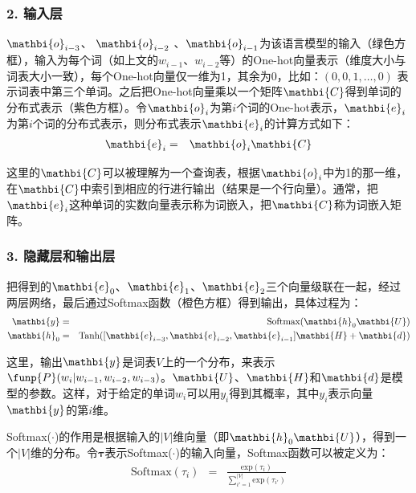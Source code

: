 \subsubsection{2. 输入层}

\parinterval  $ {\mathbi{o}}_{i-3} $、 $ {\mathbi{o}}_{i-2} $ 、$ {\mathbi{o}}_{i-1} $为该语言模型的输入（绿色方框），输入为每个词（如上文的$ w_{i-1}$、$ w_{i-2}$等）的One-hot向量表示（维度大小与词表大小一致），每个One-hot向量仅一维为1，其余为0，比如：$ (0,0,1,\dots,0) $ 表示词表中第三个单词。之后把One-hot向量乘以一个矩阵$ \mathbi{C} $得到单词的分布式表示（紫色方框）。令$ {\mathbi{o}}_i $为第$ i $个词的One-hot表示，$ {\mathbi{e}}_i $为第$ i $个词的分布式表示，则分布式表示$ {\mathbi{e}}_i $的计算方式如下：
\begin{eqnarray}
{\mathbi{e}}_i&=&{\mathbi{o}}_i{\mathbi{C}}
\label{eq:9-60}
\end{eqnarray}

\noindent  这里的$ \mathbi{C} $可以被理解为一个查询表，根据$ {\mathbi{o}}_i $中为1的那一维，在$ \mathbi{C}$中索引到相应的行进行输出（结果是一个行向量）。通常，把${\mathbi{e}}_i$这种单词的实数向量表示称为词嵌入，把$ \mathbi{C} $称为词嵌入矩阵。


\subsubsection{3. 隐藏层和输出层}

\parinterval  把得到的$ {\mathbi{e}}_0 $、$ {\mathbi{e}}_1 $、$ {\mathbi{e}}_2 $三个向量级联在一起，经过两层网络，最后通过Softmax函数（橙色方框）得到输出，具体过程为：
\begin{eqnarray}
{\mathbi{y}}&=&{\textrm{Softmax}}({\mathbi{h}}_0{\mathbi{U}})\label{eq:9-61}\\
{\mathbi{h}}_0&=&{\textrm{Tanh}}([{\mathbi{e}}_{i-3},{\mathbi{e}}_{i-2},{\mathbi{e}}_{i-1}]{\mathbi{H}}+{\mathbi{d}})
\label{eq:9-62}
\end{eqnarray}

\noindent  这里，输出$ {\mathbi{y}}$是词表$V$上的一个分布，来表示$\funp{P}(w_i|w_{i-1},w_{i-2},w_{i-3}) $。$ {\mathbi{U}}$、${\mathbi{H}}$和${\mathbi{d}}$是模型的参数。这样，对于给定的单词$w_i$可以用$y_i$得到其概率，其中$y_i$表示向量${\mathbi{y}}$的第$i$维。

\parinterval Softmax($\cdot$)的作用是根据输入的$|V|$维向量（即${\mathbi{h}}_0{\mathbi{U}}$），得到一个$|V|$维的分布。令${\bm \tau}$表示Softmax($\cdot$)的输入向量，Softmax函数可以被定义为：
\begin{eqnarray}
\textrm{Softmax}(\tau_i)&=&\frac{\textrm{exp}(\tau_i)}  {\sum_{i'=1}^{|V|} \textrm{exp}(\tau_{i'})}
\label{eq:9-120}
\end{eqnarray}

